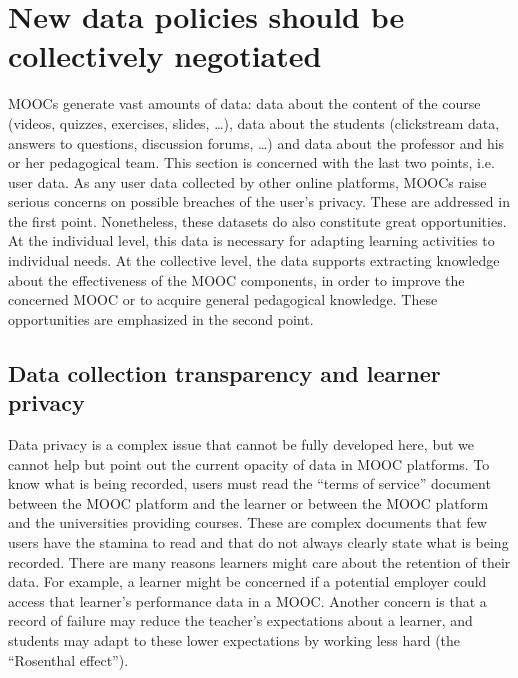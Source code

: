\section{New data policies should be collectively negotiated}

MOOCs generate vast amounts of data: data about the content of the
course (videos, quizzes, exercises, slides, \ldots), data about the
students
(clickstream data, answers to questions, discussion forums, \ldots) and data
about the professor and his or her pedagogical team. This section is
concerned with the last two points, i.e. user data.  As any user data
collected by other online platforms, MOOCs raise serious concerns on
possible breaches of the user's privacy. These are addressed in the
first point. Nonetheless, these datasets do also constitute great
opportunities. At the individual level, this data is necessary for
adapting learning activities to individual needs. At the collective
level, the data supports extracting knowledge about the effectiveness of
the MOOC components, in order to improve the concerned MOOC or to
acquire general pedagogical knowledge. These opportunities are
emphasized in the second point.
        

\subsection{Data collection transparency and learner privacy}

Data privacy is a complex issue that cannot be fully developed here, but
we cannot help but point out the current opacity of data in MOOC
platforms.  To know what is being recorded, users must read the
``terms of service'' document between the MOOC platform and the learner
or between the MOOC platform and the
universities providing courses. 
These are complex documents that few users have the stamina to read
and that do not always clearly state what is being recorded. 
There are many reasons learners might care about the retention of their
data.
For example, a learner might be concerned if a potential employer
could access that learner's performance data in a MOOC.
Another concern is that a record of
failure may reduce the teacher's expectations about a learner,
and students may adapt to these lower expectations by
working less hard (the ``Rosenthal effect'').

